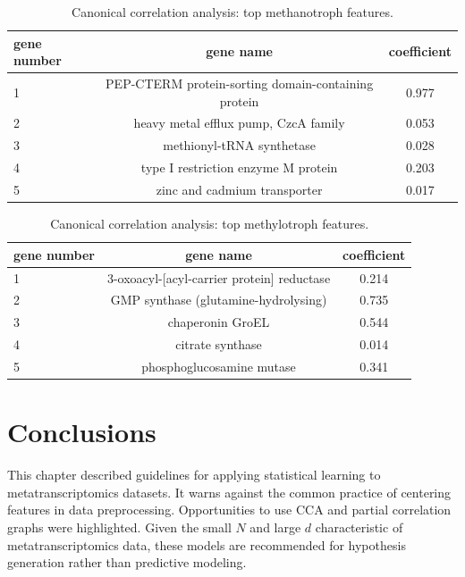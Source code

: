 \begin{table}[H]
\centering
\begin{singlespace}
\caption[Canonical correlation analysis: top features]{Canonical correlation analysis: top methanotroph features.}
\begin{tabular}{l | c | c}
          gene number & gene name & coefficient  \\
\midrule
	1 & PEP-CTERM protein-sorting domain-containing  protein & 0.977  \\
	2 & heavy metal efflux pump, CzcA family &  0.053  \\
	3 & methionyl-tRNA synthetase &  0.028 \\
	4 & type I restriction enzyme M protein &  0.203 \\
	5 & zinc and cadmium transporter &  0.017 \\
\end{tabular}
\label{table:CCA_methanotroph}
\end{singlespace}
\end{table}

\begin{table}[H]
\centering
\begin{singlespace}
\caption[Canonical correlation analysis: top features]{Canonical correlation analysis: top methylotroph features.}
\begin{tabular}{l | c | c}
          gene number & gene name & coefficient  \\
\midrule
	1 & 3-oxoacyl-[acyl-carrier protein] reductase & 0.214 \\
	2 & GMP synthase (glutamine-hydrolysing) & 0.735 \\
	3 & chaperonin GroEL & 0.544 \\
	4 & citrate synthase & 0.014 \\
	5 & phosphoglucosamine mutase & 0.341 \\
\end{tabular}
\label{table:CCA_methylotroph}
\end{singlespace}
\end{table}

\section{Conclusions}

This chapter described guidelines for applying statistical learning to metatranscriptomics datasets.
It warns against the common practice of centering features in data preprocessing.
Opportunities to use CCA and partial correlation graphs were highlighted.
Given the small $N$ and large $d$ characteristic of metatranscriptomics data, these models are recommended for hypothesis generation rather than predictive modeling.

